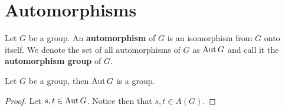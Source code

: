 \section{Automorphisms}
\label{section_4.4}

\begin{definition}
  Let $G$ be a group. An \textbf{automorphism} of $G$ is an isomorphism from
  $G$ onto itself. We denote the set of all automorphisms of $G$ as $\operatorname{Aut}{G}$
  and call it the \textbf{automorphism group} of $G$.
\end{definition}

\begin{lemma}\label{lemma_4.4.1}
  Let $G$ be a group, then  $\operatorname{Aut}{G}$ is a group.
\end{lemma}
\begin{proof}
  Let $s,t \in \operatorname{Aut}{G}$. Notice then that $s,t \in A(G)$.
\end{proof}


